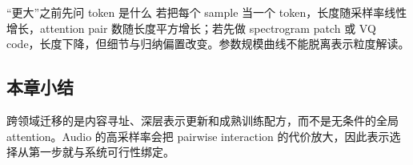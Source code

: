 
\begin{warningbox}{“更大”之前先问 token 是什么}
若把每个 sample 当一个 token，长度随采样率线性增长，attention pair 数随长度平方增长；若先做 spectrogram patch 或 VQ code，长度下降，但细节与归纳偏置改变。参数规模曲线不能脱离表示粒度解读。
\end{warningbox}

\subsection{本章小结}

跨领域迁移的是内容寻址、深层表示更新和成熟训练配方，而不是无条件的全局 attention。Audio 的高采样率会把 pairwise interaction 的代价放大，因此表示选择从第一步就与系统可行性绑定。

